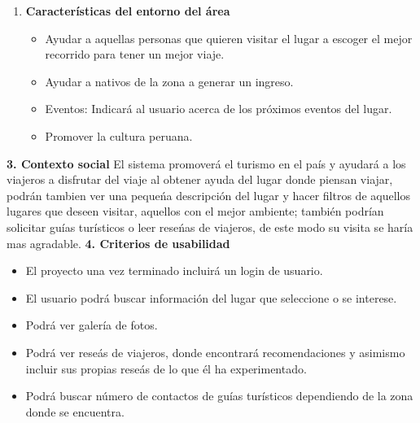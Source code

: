 \documentclass[12pt,a4paper]{report}
\begin{document}
\begin{enumerate}[2.1.]
\item \textbf{\hspace{0.3cm} Caracter\'isticas del entorno del \'area}
\begin{itemize}
\item Ayudar a aquellas personas que quieren visitar el lugar a escoger el mejor recorrido para tener un mejor viaje.
\item Ayudar a nativos de la zona a generar un ingreso.
\item Eventos: Indicar\'a al usuario acerca de los pr\'oximos eventos del lugar.
\item Promover la cultura peruana.
\end{itemize}

\end{enumerate}

\hfill \break
\hfill \break
\textbf{\Large 3. \hspace{0.3cm} Contexto social}
\hfill \break
\hfill \break
El sistema promover\'a el turismo en el pa\'is y ayudar\'a a los viajeros a disfrutar del viaje al obtener ayuda del lugar donde piensan viajar, podr\'an tambien ver una peque\'na descripci\'on del lugar y hacer filtros de aquellos lugares que deseen visitar, aquellos con el mejor ambiente; tambi\'en podr\'ian solicitar gu\'ias tur\'isticos o leer rese\'nas de viajeros, de este modo su visita se har\'ia mas agradable.
\hfill \break
\hfill \break
\hfill \break
\textbf{\Large 4. \hspace{0.3cm} Criterios de usabilidad }
\begin{itemize}
\item El proyecto una vez terminado incluir\'a un login de usuario.
\item El usuario podr\'a buscar informaci\'on del lugar que seleccione o se interese.
\item Podr\'a ver galer\'ia de fotos.
\item Podr\'a ver rese\'as de viajeros, donde encontrar\'a recomendaciones y asimismo incluir sus propias rese\'as de lo que \'el ha experimentado.
\item Podr\'a buscar n\'umero de contactos de gu\'ias tur\'isticos dependiendo de la zona donde se encuentra.

\end{itemize}
\end{document}

